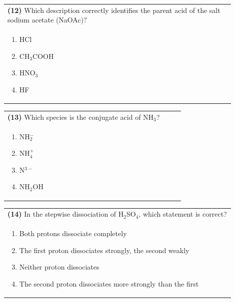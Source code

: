 \documentclass{article}
\begin{document}
\noindent\begin{tabular}{|p{0.9\linewidth}|}
\hline
\textbf{(12)} Which description correctly identifies the parent acid of the salt sodium acetate (NaOAc)? \\[0.2cm]
\begin{minipage}{0.85\linewidth}
\begin{enumerate}[label=\alph*.]
\item HCl \item CH$_3$COOH \item HNO$_3$ \item HF
\end{enumerate}
\end{minipage}\\[0.2cm]
\hline
\end{tabular}
\newpage

\noindent\begin{tabular}{|p{0.9\linewidth}|}
\hline
\textbf{(13)} Which species is the conjugate acid of NH$_3$? \\[0.2cm]
\begin{minipage}{0.85\linewidth}
\begin{enumerate}[label=\alph*.]
\item NH$_2^-$ \item NH$_4^+$ \item N$^{3-}$ \item NH$_2$OH
\end{enumerate}
\end{minipage}\\[0.2cm]
\hline
\end{tabular}

\noindent\begin{tabular}{|p{0.9\linewidth}|}
\hline
\textbf{(14)} In the stepwise dissociation of H$_2$SO$_4$, which statement is correct? \\[0.2cm]
\begin{minipage}{0.85\linewidth}
\begin{enumerate}[label=\alph*.]
\item Both protons dissociate completely \item The first proton dissociates strongly, the second weakly \item Neither proton dissociates \item The second proton dissociates more strongly than the first
\end{enumerate}
\end{minipage}\\[0.2cm]
\hline
\end{tabular}
\end{document}
